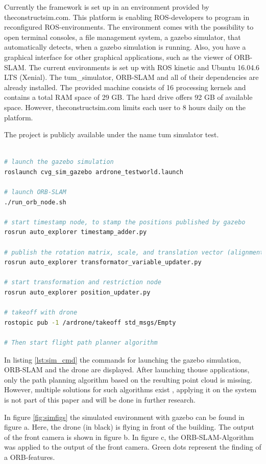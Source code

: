 	Currently the framework is set up in an environment provided by theconstructsim.com. This platform is enabling ROS-developers to program in reconfigured
	ROS-environments. The environment comes with the possibility to open terminal consoles, a file management system, a gazebo simulator, that automatically 
	detects, when a gazebo simulation is running. Also, you have a graphical interface for other graphical applications, such as the viewer of ORB-SLAM.
	The current environments is set up with ROS kinetic and Ubuntu 16.04.6 LTS (Xenial). The tum\_simulator, ORB-SLAM and all of their dependencies are already installed. 
	The provided machine consists of 16 processing kernels and contains a total RAM space of 29 GB.  The hard drive offers 92 GB of available space. However, 
	theconstructsim.com limits each user to 8 hours daily on the platform. 
	
	The project is publicly available under the name tum simulator test.
	
	\begin{lstlisting}[language=bash, caption= Launching the simulated environment, label=lst:sim_cmd]
	
# launch the gazebo simulation
roslaunch cvg_sim_gazebo ardrone_testworld.launch
	
# launch ORB-SLAM
./run_orb_node.sh

# start timestamp node, to stamp the positions published by gazebo
rosrun auto_explorer timestamp_adder.py

# publish the rotation matrix, scale, and translation vector (alignment node)
rosrun auto_explorer transformator_variable_updater.py

# start transformation and restriction node
rosrun auto_explorer position_updater.py
	
# takeoff with drone 
rostopic pub -1 /ardrone/takeoff std_msgs/Empty

# Then start flight path planner algorithm

	\end{lstlisting}
	
	In listing \ref{lst:sim_cmd} the commands for launching the gazebo simulation, ORB-SLAM and the drone are displayed. After launching thouse 
	applications, only the path planning algorithm based on the resulting point cloud is missing. However, multiple solutions for such algorithms 
	exist \cite{path}, applying it on the system is not part of this paper and will be done in further research. 
	
	In figure \ref{fig:simfigs} the simulated environment with gazebo can be found in figure a. Here, the drone (in black) is flying in front of the building. 
	The output of the front camera is shown in figure b. In figure c, the ORB-SLAM-Algorithm was applied to the output of the front camera. Green dots represent the 
	finding of a ORB-features.
	
